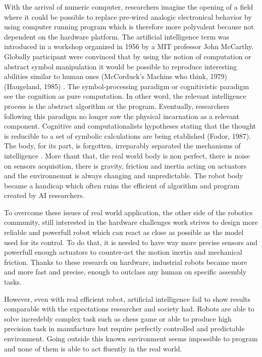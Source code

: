 With the arrival of numeric computer, researchers imagine the opening of a field where it could be possible to replace pre-wired analogic electronical behavior by using computer running program which is therefore more polyvalent because not dependent on the hardware platform. The artificial intelligence term was introduced in a workshop organized in 1956 by a MIT professor John McCarthy. Globally participant were convinced that by using the notion of computation or abstract symbol manipulation it would be possible to reproduce interesting abilities similar to human ones (McCorduck's Machins who think, 1979) (Haugeland, 1985) . The symbol-processing paradigm or cognitivistic paradigm see the cognition as pure computation. In other word, the relevant intelligence process is the abstract algorithm or the program. Eventually, researchers following this paradigm no longer saw the physical incarnation as a relevant component. Cognitive and computationalists hypotheses stating that the thought is reducible to a set of symbolic calculations are being etablished (Fodor, 1987). The body, for its part, is forgotten, irreparably separated the mechanisms of intelligence \cite{kaplan2008corps}. More thant that, the real world body is non perfect, there is noise on sensors acquisition, there is gravity, friction and inertia acting on actuators and the environnemnt is always changing and unpredictable. The robot body became a handicap which often ruins the efficient of algorithm and program created by AI researchers.

To overcome these issues of real world application, the other side of the robotics community, still interested in the hardware challenges work strives to design more reliable and powerfull robot which can react as close as possible as the model used for its control. To do that, it is needed to have way more precise sensors and powerfull enough actuators to counter-act the motion inertia and mechanical friction. Thanks to these research on hardware, industrial robots became more and more fast and precise, enough to outclass any human on specific assembly tasks.

However, even with real efficient robot, artificial intelligence fail to show results comparable with the expectations researcher and society had. Robots are able to solve incredebly complex task such as chess game or able to produce high precision task in manufacture but require perfectly controlled and predictable environment. Going outside this known environment seems impossible to program and none of them is able to act fluently in the real world.

